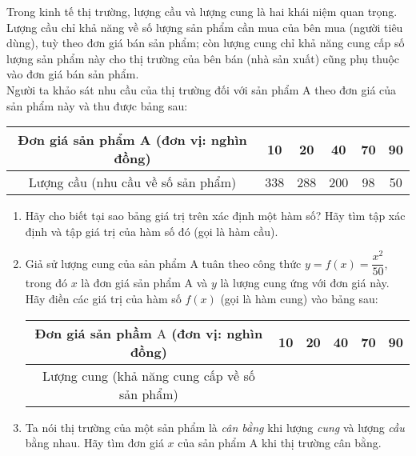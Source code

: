 \begin{ex}%
Trong kinh tế thị trường, lượng cầu và lượng cung là hai khái niệm quan trọng. Lượng cầu chỉ khả năng về số lượng sản phẩm cần mua của bên mua (người tiêu dùng), tuỳ theo đơn giá bán sản phẩm; còn lượng cung chỉ khả năng cung cấp số lượng sản phẩm này cho thị trường của bên bán (nhà sản xuất) cũng phụ thuộc vào đơn giá bán sản phẩm.\\
Người ta khảo sát nhu cầu của thị trường đối với sản phẩm $\mathrm{A}$ theo đơn giá của sản phẩm này và thu được bảng sau:
\begin{center}
\begin{tabular}{|c|c|c|c|c|c|}
    \hline Đơn giá sản phẩm A (đơn vị: nghìn đồng) & 10 & 20 & 40 & 70 & 90 \\
    \hline Lượng cầu (nhu cầu về số sản phẩm) & 338 & 288 & 200 & 98 & 50 \\
    \hline
\end{tabular}
\end{center}
\begin{enumerate}
\item Hãy cho biết tại sao bảng giá trị trên xác định một hàm số? Hãy tìm tập xác định và tập giá trị của hàm số đó (gọi là hàm cầu).
\item Giả sử lượng cung của sản phẩm $\mathrm{A}$ tuân theo công thức $y=f(x)=\dfrac{x^{2}}{50}$, trong đó $x$ là đơn giá sản phẩm $\mathrm{A}$ và $y$ là lượng cung ứng với đơn giá này. Hãy điền các giá trị của hàm số $f(x)$ (gọi là hàm cung) vào bảng sau:
\begin{center}
\begin{tabular}{|c|l|l|l|l|l|}
    \hline Đơn giá sản phầm $\mathrm{A}$ (đơn vị: nghìn đồng) & 10 & 20 & 40 & 70 & 90 \\
    \hline Lượng cung (khả năng cung cấp về số sản phẩm) & & & & & \\
    \hline
\end{tabular}
\end{center}
\item Ta nói thị trường của một sản phẩm là \textit{cân bằng} khi lượng \textit{cung }và lượng \textit{cầu} bằng nhau. Hãy tìm đơn giá $x$ của sản phẩm  A khi thị trường cân bằng.
\end{enumerate}
\end{ex}
